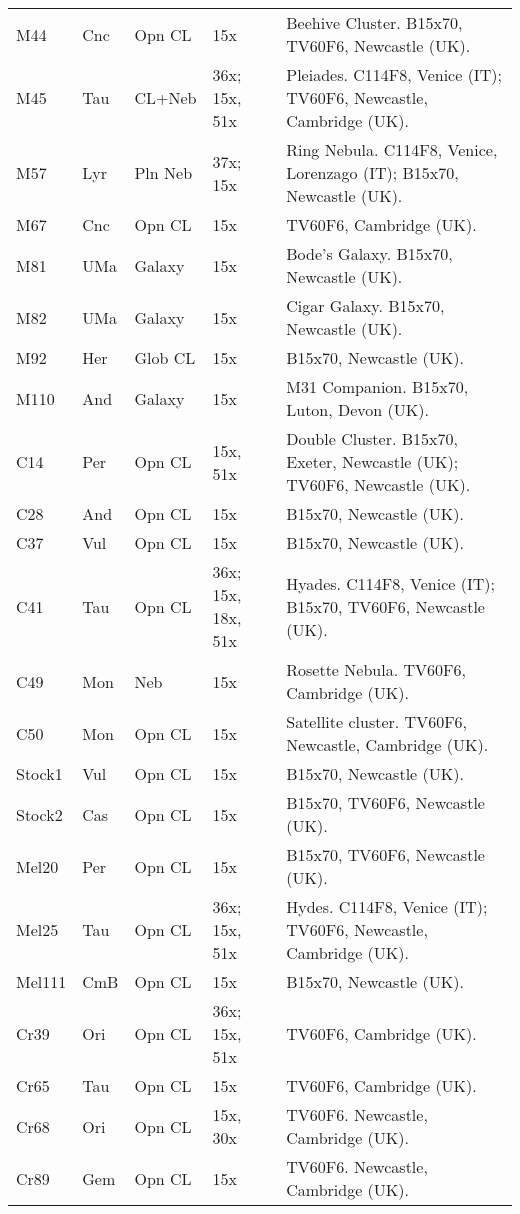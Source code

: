 \begin{longtable}{ p{0.8in}  p{0.3in}  p{0.5in}  p{0.9in}  p{5.8in} }
M44 & Cnc & Opn CL & 15x & Beehive Cluster. B15x70, TV60F6, Newcastle (UK). \\ 
M45 & Tau & CL+Neb & 36x; 15x, 51x & Pleiades. C114F8, Venice (IT); TV60F6, Newcastle, Cambridge (UK). \\ 
M57 & Lyr & Pln Neb & 37x; 15x & Ring Nebula. C114F8, Venice, Lorenzago (IT); B15x70, Newcastle (UK). \\ 
M67 & Cnc & Opn CL & 15x & TV60F6, Cambridge (UK). \\ 
M81 & UMa & Galaxy & 15x & Bode's Galaxy. B15x70, Newcastle (UK). \\ 
M82 & UMa & Galaxy & 15x & Cigar Galaxy. B15x70, Newcastle (UK). \\ 
M92 & Her & Glob CL & 15x & B15x70, Newcastle (UK). \\ 
M110 & And & Galaxy & 15x & M31 Companion. B15x70, Luton, Devon (UK). \\ 
C14 & Per & Opn CL & 15x, 51x & Double Cluster. B15x70, Exeter, Newcastle (UK); TV60F6, Newcastle (UK). \\ 
C28 & And & Opn CL & 15x & B15x70, Newcastle (UK). \\ 
C37 & Vul & Opn CL & 15x & B15x70, Newcastle (UK). \\ 
C41 & Tau & Opn CL & 36x; 15x, 18x, 51x & Hyades. C114F8, Venice (IT); B15x70, TV60F6, Newcastle (UK). \\ 
C49 & Mon & Neb & 15x & Rosette Nebula. TV60F6, Cambridge (UK). \\ 
C50 & Mon & Opn CL & 15x & Satellite cluster. TV60F6, Newcastle, Cambridge (UK). \\ 
Stock1 & Vul & Opn CL & 15x & B15x70, Newcastle (UK). \\ 
Stock2 & Cas & Opn CL & 15x & B15x70, TV60F6, Newcastle (UK). \\ 
Mel20 & Per & Opn CL & 15x & B15x70, TV60F6, Newcastle (UK). \\ 
Mel25 & Tau & Opn CL & 36x; 15x, 51x & Hydes. C114F8, Venice (IT); TV60F6, Newcastle, Cambridge (UK). \\ 
Mel111 & CmB & Opn CL & 15x & B15x70, Newcastle (UK). \\ 
Cr39 & Ori & Opn CL & 36x; 15x, 51x & TV60F6, Cambridge (UK). \\ 
Cr65 & Tau & Opn CL & 15x & TV60F6, Cambridge (UK). \\ 
Cr68 & Ori & Opn CL & 15x, 30x & TV60F6. Newcastle, Cambridge (UK). \\ 
Cr89 & Gem & Opn CL & 15x & TV60F6. Newcastle, Cambridge (UK). \\ 

\end{longtable}
